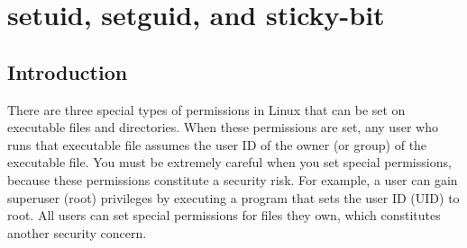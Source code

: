 \chapter{setuid, setguid, and sticky-bit}
\label{ch:setuid}
\pagestyle{fancy}

\fancyhf{} %
\fancyhead[OC]{\leftmark} %
\setlength{\headheight}{13.6pt} 
\cfoot{\thepage} %
\section{Introduction}
There are three special types of permissions in Linux that can be set on executable files and directories. When these permissions are set, any user who runs that executable file assumes the user ID of the owner (or group) of the executable file. You must be extremely careful when you set special permissions, because these permissions constitute a security risk. For example, a user can gain superuser (root) privileges by executing a program that sets the user ID (UID) to root. All users can set special permissions for files they own, which constitutes another security concern.

